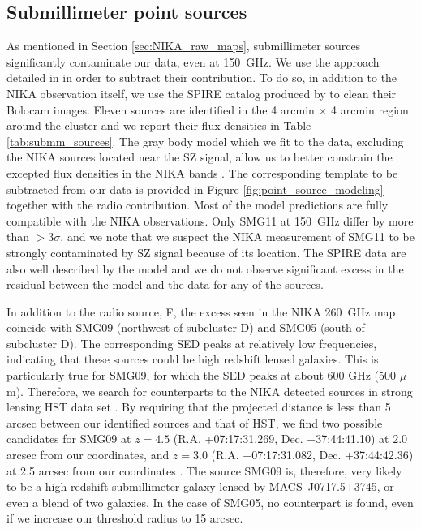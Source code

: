 \documentclass[twocolumn,traditabstract]{aa}
\begin{document}
\subsection{Submillimeter point sources}\label{sec:Submillimeter_point_sources}
As mentioned in Section \ref{sec:NIKA_raw_maps}, submillimeter sources significantly contaminate our data, even at 150~GHz. We use the approach detailed in \cite{Adam2016} in order to subtract their contribution. To do so, in addition to the NIKA observation itself, we use the SPIRE \citep[Spectral and Photometric Imaging REceiver,][]{Griffin2010} catalog produced by \cite{Sayers2013} to clean their Bolocam images. Eleven sources are identified in the 4 arcmin $\times$ 4 arcmin region around the cluster and we report their flux densities in Table \ref{tab:submm_sources}. The gray body model which we fit to the data, excluding the NIKA sources located near the SZ signal, allow us to better constrain the excepted flux densities in the NIKA bands \citep[see][for more details]{Adam2016}. The corresponding template to be subtracted from our data is provided in Figure  \ref{fig:point_source_modeling} together with the radio contribution. Most of the model predictions are fully compatible with the NIKA observations. Only SMG11 at 150~GHz differ by more than $>3 \sigma$, and we note that we suspect the NIKA measurement of SMG11 to be strongly contaminated by SZ signal because of its location. The SPIRE data are also well described by the model and we do not observe significant excess in the residual between the model and the data for any of the sources.

In addition to the radio source, F, the excess seen in the NIKA 260~GHz map coincide with SMG09 (northwest of subcluster D) and SMG05 (south of subcluster D). The corresponding SED peaks at relatively low frequencies, indicating that these sources could be high redshift lensed galaxies. This is particularly true for SMG09, for which the SED peaks at about 600 GHz (500 $\mu$m). Therefore, we search for counterparts to the NIKA detected sources in strong lensing HST data set \citep[Hubble Space Telecope, Frontier Field campaign, see][]{Diego2015}. By requiring that the projected distance is less than 5 arcsec between our identified sources and that of HST, we find two possible candidates for SMG09 at $z=4.5$ (R.A. +07:17:31.269, Dec. +37:44:41.10) at 2.0 arcsec from our coordinates, and $z=3.0$ (R.A. +07:17:31.082, Dec. +37:44:42.36) at 2.5 arcsec from our coordinates \citep[ID25.1 and ID62.1, respectively,][]{Diego2015}. The source SMG09 is, therefore, very likely to be a high redshift submillimeter galaxy lensed by \mbox{MACS~J0717.5+3745}, or even a blend of two galaxies. In the case of SMG05, no counterpart is found, even if we increase our threshold radius to 15 arcsec.
\end{document}
